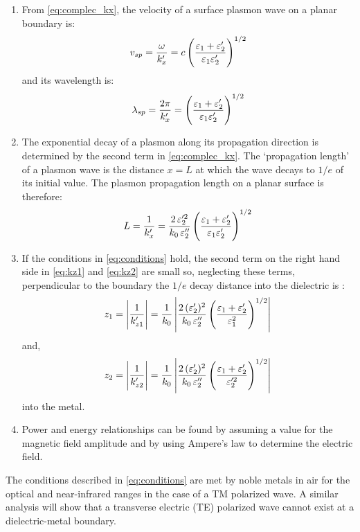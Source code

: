 \begin{enumerate}
  \item	From \eqref{eq:complec_kx}, the velocity of a surface plasmon wave on a planar boundary is:
  \begin{equation}
    v_{sp} = \frac{\omega}{k_x'} = c \left( \frac{\varepsilon_1 + \varepsilon_2'}{\varepsilon_1 \varepsilon_2'} \right)^{1/2}
    \label{eq:velocity}
  \end{equation}
  and its wavelength is:
  \begin{equation}
    \lambda_{sp} = \frac{2 \pi}{k_x'} = \left( \frac{\varepsilon_1 + \varepsilon_2'}{\varepsilon_1 \varepsilon_2'} \right)^{1/2}
    \label{eq:wavelength}
  \end{equation}
  \item	The exponential decay of a plasmon along its propagation direction is determined by the second term in \eqref{eq:complec_kx}. The `propagation length' of a plasmon wave is the distance $x = L$ at which the wave decays to   $1/e$ of its initial value. The plasmon propagation length on a planar surface is therefore:
  \begin{equation}
    L = \frac{1}{k_x'} = \frac{2 \,\varepsilon_2'^2}{k_0 \,\varepsilon_2''} \left( \frac{\varepsilon_1 + \varepsilon_2'}{\varepsilon_1 \varepsilon_2'} \right)^{1/2}
    \label{eq:plength}
  \end{equation}
  \item	If the conditions in \eqref{eq:conditions} hold, the second term on the right hand side in \eqref{eq:kz1} and \eqref{eq:kz2} are small so, neglecting these terms, perpendicular to the boundary the $1/e$ decay distance into the dielectric is \cite{Raether1988}:
  \begin{equation}
    z_1 = \left| \frac{1}{k_{z1}'} \right| = \frac{1}{k_0} \left| \frac{2 \, (\varepsilon_2')^2}{k_0 \,\varepsilon_2''} \left( \frac{\varepsilon_1 + \varepsilon_2'}{\varepsilon_1^2} \right)^{1/2} \right|
    \label{eq:decay_dielectric}
  \end{equation}
  and,
  \begin{equation}
    z_2 = \left| \frac{1}{k_{z2}'} \right| = \frac{1}{k_0} \left| \frac{2 \, (\varepsilon_2')^2}{k_0 \,\varepsilon_2''} \left( \frac{\varepsilon_1 + \varepsilon_2'}{\varepsilon_2'^2} \right)^{1/2} \right|
    \label{eq:decay_metal}
  \end{equation}
  into the metal.
  \item	Power and energy relationships can be found by assuming a value for the magnetic field amplitude and by using Ampere's law to determine the electric field.
\end{enumerate}
%
The conditions described in \eqref{eq:conditions} are met by noble metals in air for the optical and near-infrared ranges in the case of a TM polarized wave. A similar analysis will show that a transverse electric (TE) polarized wave cannot exist at a dielectric-metal boundary.

